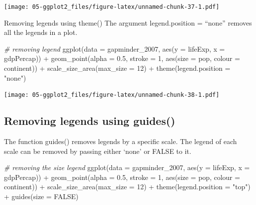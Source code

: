 \documentclass[
]{book}
\newenvironment{Shaded}{\begin{snugshade}}{\end{snugshade}}
\newcommand{\AttributeTok}[1]{\textcolor[rgb]{0.77,0.63,0.00}{#1}}
\newcommand{\CommentTok}[1]{\textcolor[rgb]{0.56,0.35,0.01}{\textit{#1}}}
\newcommand{\ConstantTok}[1]{\textcolor[rgb]{0.00,0.00,0.00}{#1}}
\newcommand{\DecValTok}[1]{\textcolor[rgb]{0.00,0.00,0.81}{#1}}
\newcommand{\FloatTok}[1]{\textcolor[rgb]{0.00,0.00,0.81}{#1}}
\newcommand{\FunctionTok}[1]{\textcolor[rgb]{0.00,0.00,0.00}{#1}}
\newcommand{\NormalTok}[1]{#1}
\newcommand{\SpecialCharTok}[1]{\textcolor[rgb]{0.00,0.00,0.00}{#1}}
\newcommand{\StringTok}[1]{\textcolor[rgb]{0.31,0.60,0.02}{#1}}
\begin{document}
\texttt{[image: 05-ggplot2\_files/figure-latex/unnamed-chunk-37-1.pdf]}

Removing legends using theme()
The argument legend.position = ``none'' removes all the legends in a plot.

\begin{Shaded}
\begin{Highlighting}[]
\CommentTok{\# removing legend}
\FunctionTok{ggplot}\NormalTok{(}\AttributeTok{data =}\NormalTok{ gapminder\_2007, }\FunctionTok{aes}\NormalTok{(}\AttributeTok{y =}\NormalTok{ lifeExp, }\AttributeTok{x =}\NormalTok{ gdpPercap)) }\SpecialCharTok{+} 
  \FunctionTok{geom\_point}\NormalTok{(}\AttributeTok{alpha =} \FloatTok{0.5}\NormalTok{, }\AttributeTok{stroke =} \DecValTok{1}\NormalTok{, }\FunctionTok{aes}\NormalTok{(}\AttributeTok{size =}\NormalTok{ pop, }\AttributeTok{colour =}\NormalTok{ continent)) }\SpecialCharTok{+}
  \FunctionTok{scale\_size\_area}\NormalTok{(}\AttributeTok{max\_size =} \DecValTok{12}\NormalTok{) }\SpecialCharTok{+}
  \FunctionTok{theme}\NormalTok{(}\AttributeTok{legend.position =} \StringTok{"none"}\NormalTok{)}
\end{Highlighting}
\end{Shaded}

\texttt{[image: 05-ggplot2\_files/figure-latex/unnamed-chunk-38-1.pdf]}

\hypertarget{removing-legends-using-guides}{%
\subsection{Removing legends using guides()}\label{removing-legends-using-guides}}

The function guides() removes legends by a specific scale. The legend of each scale can be removed by passing either `none' or FALSE to it.

\begin{Shaded}
\begin{Highlighting}[]
\CommentTok{\# removing the size legend}
\FunctionTok{ggplot}\NormalTok{(}\AttributeTok{data =}\NormalTok{ gapminder\_2007, }\FunctionTok{aes}\NormalTok{(}\AttributeTok{y =}\NormalTok{ lifeExp, }\AttributeTok{x =}\NormalTok{ gdpPercap)) }\SpecialCharTok{+} 
  \FunctionTok{geom\_point}\NormalTok{(}\AttributeTok{alpha =} \FloatTok{0.5}\NormalTok{, }\AttributeTok{stroke =} \DecValTok{1}\NormalTok{, }\FunctionTok{aes}\NormalTok{(}\AttributeTok{size =}\NormalTok{ pop, }\AttributeTok{colour =}\NormalTok{ continent)) }\SpecialCharTok{+}
  \FunctionTok{scale\_size\_area}\NormalTok{(}\AttributeTok{max\_size =} \DecValTok{12}\NormalTok{) }\SpecialCharTok{+}
  \FunctionTok{theme}\NormalTok{(}\AttributeTok{legend.position =} \StringTok{"top"}\NormalTok{) }\SpecialCharTok{+}
  \FunctionTok{guides}\NormalTok{(}\AttributeTok{size =} \ConstantTok{FALSE}\NormalTok{)}
\end{Highlighting}
\end{Shaded}
\end{document}
